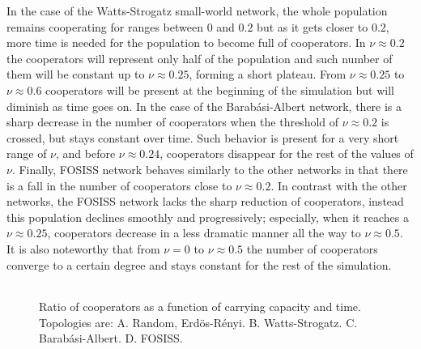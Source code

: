 \documentclass{bmcart}
\def\texttt{[image: ]}
\begin{document}
In the case of the Watts-Strogatz small-world network, the whole
population remains cooperating for ranges between $0$ and $0.2$ but as
it gets closer to $0.2$, more time is needed for the population to
become full of cooperators. In $\nu \approx 0.2$ the cooperators will
represent only half of the population and such number of them will be
constant up to $\nu \approx 0.25$, forming a short plateau. From
$\nu \approx 0.25$ to $\nu \approx 0.6$ cooperators will be present at
the beginning of the simulation but will diminish as time goes on.  In
the case of the Barab\'asi-Albert network, there is a sharp decrease
in the number of cooperators when the threshold of $\nu \approx 0.2$
is crossed, but stays constant over time. Such behavior is present for
a very short range of $\nu$, and before $\nu \approx 0.24$,
cooperators disappear for the rest of the values of $\nu$. Finally, FOSISS
network behaves similarly to the other networks in that there is a
fall in the number of cooperators close to $\nu \approx 0.2$. In
contrast with the other networks, the FOSISS network lacks the sharp
reduction of cooperators, instead this population declines smoothly
and progressively; especially, when it reaches a $\nu \approx 0.25$,
cooperators decrease in a less dramatic manner all the way to
$\nu \approx 0.5$. It is also noteworthy that from $\nu = 0$ to
$\nu \approx 0.5$ the number of cooperators converge to a certain
degree and stays constant for the rest of the simulation.\\


\begin{figure} [h!]
\centering
\begin{tabular}{cc}
\end{tabular}
\caption{Ratio of cooperators as a function of carrying capacity and time. Topologies are: A. Random, Erd\"{o}s-R\'enyi. B. Watts-Strogatz. C. Barab\'asi-Albert. D. FOSISS.
}\label{CD}
\end{figure}

\end{document}
